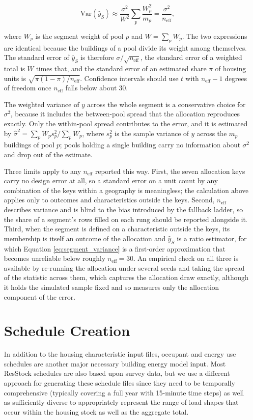 \begin{equation}\label{eq:segment_variance}
\mathrm{Var}(\hat{y}_S) \approx \frac{\sigma^2}{W^2} \sum_p \frac{W_p^2}{m_p} = \frac{\sigma^2}{n_{\mathrm{eff}}},
\end{equation}

where $W_p$ is the segment weight of pool $p$ and $W = \sum_p W_p$. The two expressions are identical because the buildings of a pool divide its weight among themselves. The standard error of $\hat{y}_S$ is therefore $\sigma / \sqrt{n_{\mathrm{eff}}}$, the standard error of a weighted total is $W$ times that, and the standard error of an estimated share $\pi$ of housing units is $\sqrt{\pi(1-\pi)/n_{\mathrm{eff}}}$. Confidence intervals should use $t$ with $n_{\mathrm{eff}} - 1$ degrees of freedom once $n_{\mathrm{eff}}$ falls below about 30.

The weighted variance of $y$ across the whole segment is a conservative choice for $\sigma^2$, because it includes the between-pool spread that the allocation reproduces exactly. Only the within-pool spread contributes to the error, and it is estimated by $\hat{\sigma}^2 = \sum_p W_p s_p^2 / \sum_p W_p$, where $s_p^2$ is the sample variance of $y$ across the $m_p$ buildings of pool $p$; pools holding a single building carry no information about $\sigma^2$ and drop out of the estimate.

Three limits apply to any $n_{\mathrm{eff}}$ reported this way. First, the seven allocation keys carry no design error at all, so a standard error on a unit count by any combination of the keys within a geography is meaningless; the calculation above applies only to outcomes and characteristics outside the keys. Second, $n_{\mathrm{eff}}$ describes variance and is blind to the bias introduced by the fallback ladder, so the share of a segment's rows filled on each rung should be reported alongside it. Third, when the segment is defined on a characteristic outside the keys, its membership is itself an outcome of the allocation and $\hat{y}_S$ is a ratio estimator, for which Equation \ref{eq:segment_variance} is a first-order approximation that becomes unreliable below roughly $n_{\mathrm{eff}} = 30$. An empirical check on all three is available by re-running the allocation under several seeds and taking the spread of the statistic across them, which captures the allocation draw exactly, although it holds the simulated sample fixed and so measures only the allocation component of the error.

\section{Schedule Creation}\label{occupancy_model}
In addition to the housing characteristic input files, occupant and energy use schedules are another major necessary building energy model input. Most ResStock schedules are also based upon survey data, but we use a different approach for generating these schedule files since they need to be temporally comprehensive (typically covering a full year with 15-minute time steps) as well as sufficiently diverse to appropriately represent the range of load shapes that occur within the housing stock as well as the aggregate total.

